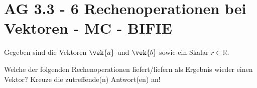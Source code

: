 \section{AG 3.3 - 6 Rechenoperationen bei Vektoren - MC - BIFIE}

\begin{beispiel}[AG 3.3]{1} %
Gegeben sind die Vektoren $\vek{a}$ und $\vek{b}$ sowie ein Skalar $r\in\mathbb{R}$.

Welche der folgenden Rechenoperationen liefert/liefern als Ergebnis wieder einen Vektor? Kreuze die zutreffende(n) Antwort(en) an!
\end{beispiel}
